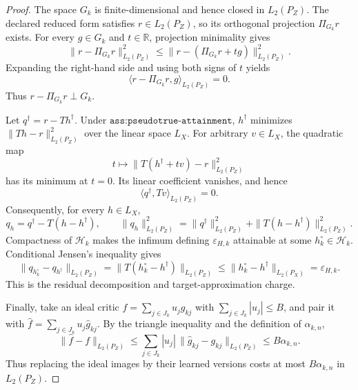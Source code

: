 \begin{proof}
The space \(G_k\) is finite-dimensional and hence closed in \(L_2(P_Z)\). The declared reduced form satisfies \(r\in L_2(P_Z)\), so its orthogonal projection \(\Pi_{G_k}r\) exists. For every \(g\in G_k\) and \(t\in\mathbb R\), projection minimality gives
\[
 \|r-\Pi_{G_k}r\|_{L_2(P_Z)}^2
 \le \|r-(\Pi_{G_k}r+t g)\|_{L_2(P_Z)}^2.
\]
Expanding the right-hand side and using both signs of \(t\) yields
\[
 \langle r-\Pi_{G_k}r,g\rangle_{L_2(P_Z)}=0.
\]
Thus \(r-\Pi_{G_k}r\perp G_k\).

Let \(q^\dagger=r-Th^\dagger\). Under \(\texttt{ass:pseudotrue-attainment}\), \(h^\dagger\) minimizes \(\|Th-r\|_{L_2(P_Z)}^2\) over the linear space \(L_X\). For arbitrary \(v\in L_X\), the quadratic map
\[
 t\longmapsto \|T(h^\dagger+t v)-r\|_{L_2(P_Z)}^2
\]
has its minimum at \(t=0\). Its linear coefficient vanishes, and hence
\[
 \langle q^\dagger,Tv\rangle_{L_2(P_Z)}=0.
\]
Consequently, for every \(h\in L_X\),
\[
 q_h=q^\dagger-T(h-h^\dagger),
 \qquad
 \|q_h\|_{L_2(P_Z)}^2
 =\|q^\dagger\|_{L_2(P_Z)}^2
 +\|T(h-h^\dagger)\|_{L_2(P_Z)}^2.
\]
Compactness of \(\mathcal H_k\) makes the infimum defining \(\varepsilon_{H,k}\) attainable at some \(h_k^\circ\in\mathcal H_k\). Conditional Jensen's inequality gives
\[
 \|q_{h_k^\circ}-q_{h^\dagger}\|_{L_2(P_Z)}
 =\|T(h_k^\circ-h^\dagger)\|_{L_2(P_Z)}
 \le\|h_k^\circ-h^\dagger\|_{L_2(P_X)}
 =\varepsilon_{H,k}.
\]
This is the residual decomposition and target-approximation charge.

Finally, take an ideal critic \(f=\sum_{j\in J_k}u_jg_{kj}\) with \(\sum_{j\in J_k}|u_j|\le B\), and pair it with \(\widehat f=\sum_{j\in J_k}u_j\widehat g_{kj}\). By the triangle inequality and the definition of \(\alpha_{k,n}\),
\[
 \|\widehat f-f\|_{L_2(P_Z)}
 \le\sum_{j\in J_k}|u_j|\,\|\widehat g_{kj}-g_{kj}\|_{L_2(P_Z)}
 \le B\alpha_{k,n}.
\]
Thus replacing the ideal images by their learned versions costs at most \(B\alpha_{k,n}\) in \(L_2(P_Z)\).
\end{proof}